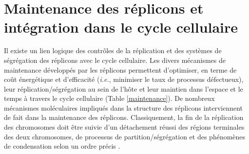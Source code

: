 \section{Maintenance des réplicons et intégration dans le cycle cellulaire}\label{regul}
	Il existe un lien logique des contrôles de la réplication et des systèmes de ségrégation des réplicons avec le cycle cellulaire. Les divers mécanismes de maintenance développés par les réplicons permettent d'optimiser, en terme de coût énergétique et d'efficacité (\textit{i.e.}, minimiser le taux de processus défectueux), leur réplication/ségrégation au sein de l'hôte et leur maintien dans l'espace et le temps à travers le cycle cellulaire (Table \ref{maintenance}). De nombreux mécanismes moléculaires impliqués dans la structure des réplicons interviennent de fait dans la maintenance des réplicons. Classiquement, la fin de la réplication des chromosomes doit être suivie d'un détachement réussi des régions terminales des deux chromosomes, de processus de partition/ségrégation et des phénomènes de condensation selon un ordre précis \citep{thanbichler2010}. 
\\
